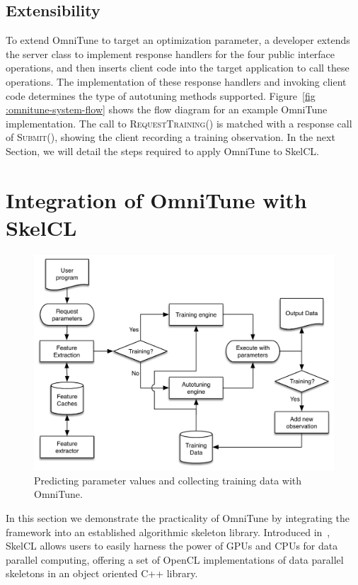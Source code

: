 \documentclass[nonatbib,preprint,nocopyrightspace,9pt]{sigplanconf}
\begin{document}
  \subsection{Extensibility}

  To extend OmniTune to target an optimization parameter, a developer extends the
  server class to implement response handlers for the four public interface
  operations, and then inserts client code into the target application to call
  these operations. The implementation of these response handlers and invoking
  client code determines the type of autotuning methods supported. Figure~\ref{fig
  :omnitune-system-flow} shows the flow diagram for an example OmniTune
  implementation. The call to \textsc{RequestTraining()} is matched with a
  response call of \textsc{Submit()}, showing the client recording a training
  observation. In the next Section, we will detail the steps required to apply
  OmniTune to SkelCL.


  \section{Integration of OmniTune with SkelCL}\label{sec:omnitune-skelcl}

  \begin{figure}
    \centering
    \includegraphics[width=\columnwidth]{img/omnitune-system-flow.pdf}
    \caption{%
    Predicting parameter values and collecting training data with OmniTune.%
    }
    \label{fig:omnitune-system-flow}
  \end{figure}

  In this section we demonstrate the practicality of OmniTune by integrating the
  framework into an established algorithmic skeleton library. Introduced
  in~\cite{Steuwer2011}, SkelCL allows users to easily harness the power of GPUs
  and CPUs for data parallel computing, offering a set of OpenCL implementations
  of data parallel skeletons in an object oriented C++ library.
\end{document}

